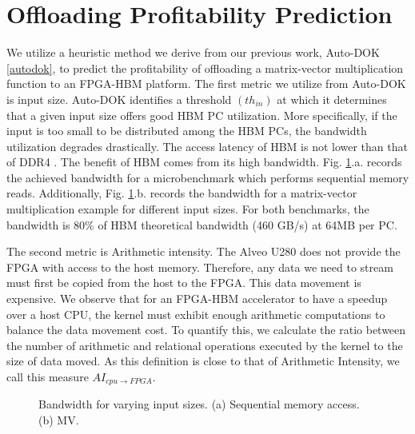 \documentclass[manuscript,screen,review]{acmart}
\begin{document}
\section{Offloading Profitability Prediction}
\label{offloading-profitability}
We utilize a heuristic method we derive from our previous work, Auto-DOK \ref{autodok}, to predict the profitability of offloading a matrix-vector multiplication function to an FPGA-HBM platform. The first metric we utilize from Auto-DOK is input size. Auto-DOK identifies a threshold $(th_{in})$ at which it determines that a given input size offers good HBM PC utilization. More specifically, if the input is too small to be distributed among the HBM PCs, the bandwidth utilization degrades drastically. The access latency of HBM is not lower than that of DDR4 \cite{Shuhai,9460576}. The benefit of HBM comes from its high bandwidth. Fig. \ref{fig:example}.a. records the achieved bandwidth for a microbenchmark which performs sequential memory reads. Additionally, Fig. \ref{fig:example}.b. records the bandwidth for a matrix-vector multiplication example for different input sizes. For both benchmarks, the bandwidth is 80\% of HBM theoretical bandwidth (460 GB/s) at 64MB per PC.

The second metric is Arithmetic intensity. The Alveo U280 does not provide the FPGA with access to the host memory. Therefore, any data we need to stream must first be copied from the host to the FPGA. This data movement is expensive. We observe that for an FPGA-HBM accelerator to have a speedup over a host CPU, the kernel must exhibit enough arithmetic computations to balance the data movement cost. To quantify this, we calculate the ratio between the number of arithmetic and relational operations executed by the kernel to the size of data moved. As this definition is close to that of Arithmetic Intensity, we call this measure $AI_{cpu\rightarrow FPGA}$.

\begin{figure}%
	\centering
	\qquad
	\caption{Bandwidth for varying input sizes. (a) Sequential memory access. (b) MV.}%
	\label{fig:example}%
\end{figure}
\end{document}
